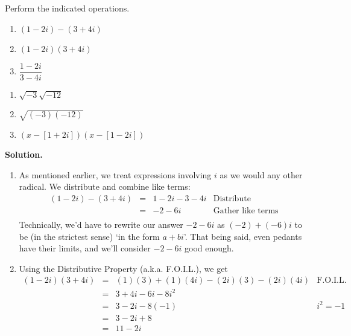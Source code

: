\documentclass[10pt]{article}
\begin{document}
\begin{ex} \label{complexzeroex1} Perform the indicated operations.
\label{complexnumberarithmetic}

\begin{multicols}{3}
\begin{enumerate}

\item  $(1-2i) - (3+4i)$ 
\item  $(1-2i)(3+4i)$ 
\item  $\dfrac{1-2i}{3-4i}$

\setcounter{HW}{\value{enumi}}
\end{enumerate}
\end{multicols}

\begin{multicols}{3}
\begin{enumerate}
\setcounter{enumi}{\value{HW}}

\item  $\sqrt{-3} \sqrt{-12}$
\item  $\sqrt{(-3)(-12)}$
\item  $(x-[1+2i])(x-[1-2i])$

\setcounter{HW}{\value{enumi}}
\end{enumerate}
\end{multicols}

{\bf Solution.} 

\begin{enumerate}

\item  As mentioned earlier, we treat expressions involving $i$ as we would any other radical. We distribute and combine like terms:\[ \begin{array}{rclr}

 (1-2i) - (3+4i) & = &  1-2i-3-4i & \text{Distribute} \\
                 & = &  -2 - 6i & \text{Gather like terms} \\
\end{array}\] Technically, we'd have to rewrite our answer  $-2-6i$ as $(-2) + (-6)i$ to be (in the strictest sense) `in the form $a+bi$'. That being said, even pedants have their limits, and we'll consider $-2-6i$ good enough.

\item  Using the Distributive Property (a.k.a. F.O.I.L.), we get \[ \begin{array}{rclr}

  (1-2i)(3+4i)  & = & (1)(3) + (1)(4i) - (2i)(3) - (2i)(4i) & \text{F.O.I.L.} \\
	              & = & 3+4i-6i-8i^2 & \\
								& = & 3 - 2i - 8(-1) & \text{$i^2=-1$} \\
								& = & 3 - 2i + 8 & \\
								& = & 11 - 2i & \\ \end{array}\]


\end{enumerate}
\end{ex}
\end{document}
